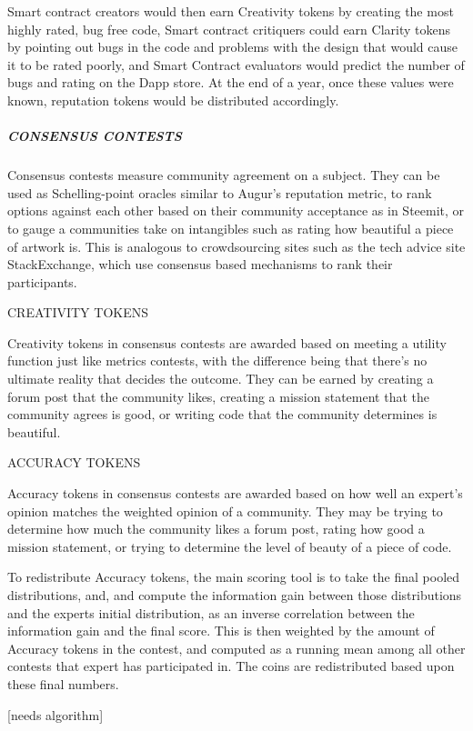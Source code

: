 Smart contract creators would then earn Creativity tokens by creating
the most highly rated, bug free code, Smart contract critiquers could
earn Clarity tokens by pointing out bugs in the code and problems with
the design that would cause it to be rated poorly, and Smart Contract
evaluators would predict the number of bugs and rating on the Dapp
store. At the end of a year, once these values were known, reputation
tokens would be distributed accordingly.

\subparagraph{CONSENSUS CONTESTS}\label{consensus-contests}

Consensus contests measure community agreement on a subject. They can be
used as Schelling-point oracles similar to Augur's reputation metric, to
rank options against each other based on their community acceptance as
in Steemit, or to gauge a communities take on intangibles such as rating
how beautiful a piece of artwork is. This is analogous to crowdsourcing
sites such as the tech advice site StackExchange, which use consensus
based mechanisms to rank their participants.

CREATIVITY TOKENS

Creativity tokens in consensus contests are awarded based on meeting a
utility function just like metrics contests, with the difference being
that there's no ultimate reality that decides the outcome. They can be
earned by creating a forum post that the community likes, creating a
mission statement that the community agrees is good, or writing code
that the community determines is beautiful.

ACCURACY TOKENS

Accuracy tokens in consensus contests are awarded based on how well an
expert's opinion matches the weighted opinion of a community. They may
be trying to determine how much the community likes a forum post, rating
how good a mission statement, or trying to determine the level of beauty
of a piece of code.

To redistribute Accuracy tokens, the main scoring tool is to take the
final pooled distributions, and, and compute the information gain
between those distributions and the experts initial distribution, as an
inverse correlation between the information gain and the final score.
This is then weighted by the amount of Accuracy tokens in the contest,
and computed as a running mean among all other contests that expert has
participated in. The coins are redistributed based upon these final
numbers.

{[}needs algorithm{]}

